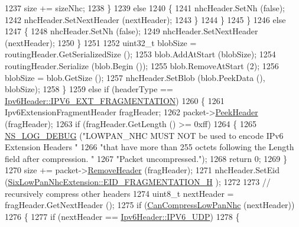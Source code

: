 \begin{DoxyCode}
1237                   size += sizeNhc;
1238                 \}
1239               \textcolor{keywordflow}{else}
1240                 \{
1241                   nhcHeader.SetNh (\textcolor{keyword}{false});
1242                   nhcHeader.SetNextHeader (nextHeader);
1243                 \}
1244             \}
1245         \}
1246       \textcolor{keywordflow}{else}
1247         \{
1248           nhcHeader.SetNh (\textcolor{keyword}{false});
1249           nhcHeader.SetNextHeader (nextHeader);
1250         \}
1251 
1252       uint32\_t blobSize = routingHeader.GetSerializedSize ();
1253       blob.AddAtStart (blobSize);
1254       routingHeader.Serialize (blob.Begin ());
1255       blob.RemoveAtStart (2);
1256       blobSize = blob.GetSize ();
1257       nhcHeader.SetBlob (blob.PeekData (), blobSize);
1258     \}
1259   \textcolor{keywordflow}{else} \textcolor{keywordflow}{if} (headerType == \hyperlink{classns3_1_1Ipv6Header_a226429221a066c5e3b1f260caf27d1e9a5839daf3fdfb16dfdc94a208ca6ebc5a}{Ipv6Header::IPV6\_EXT\_FRAGMENTATION})
1260     \{
1261       Ipv6ExtensionFragmentHeader fragHeader;
1262       packet->\hyperlink{classns3_1_1Packet_aadc63487bea70945c418f4c3e9b81964}{PeekHeader} (fragHeader);
1263       \textcolor{keywordflow}{if} (fragHeader.GetLength () >= 0xff)
1264         \{
1265           \hyperlink{group__logging_ga413f1886406d49f59a6a0a89b77b4d0a}{NS\_LOG\_DEBUG} (\textcolor{stringliteral}{"LOWPAN\_NHC MUST NOT be used to encode IPv6 Extension Headers "}
1266                         \textcolor{stringliteral}{"that have more than 255 octets following the Length field after compression. "}
1267                         \textcolor{stringliteral}{"Packet uncompressed."});
1268           \textcolor{keywordflow}{return} 0;
1269         \}
1270       size += packet->\hyperlink{classns3_1_1Packet_a0961eccf975d75f902d40956c93ba63e}{RemoveHeader} (fragHeader);
1271       nhcHeader.SetEid (\hyperlink{classns3_1_1SixLowPanNhcExtension_ac692a22abe80c30bcbafa57ef36bf5ada62051012ae9fe03967626d4c451f39fd}{SixLowPanNhcExtension::EID\_FRAGMENTATION\_H}
      );
1272 
1273       \textcolor{comment}{// recursively compress other headers}
1274       uint8\_t nextHeader = fragHeader.GetNextHeader ();
1275       \textcolor{keywordflow}{if} (\hyperlink{classns3_1_1SixLowPanNetDevice_a44cfa681aaac7a83c160e9cdfc90d7e0}{CanCompressLowPanNhc} (nextHeader))
1276         \{
1277           \textcolor{keywordflow}{if} (nextHeader == \hyperlink{classns3_1_1Ipv6Header_a226429221a066c5e3b1f260caf27d1e9aef42146d6b211521c22f827b04530253}{Ipv6Header::IPV6\_UDP})
1278             \{

\end{DoxyCode}
